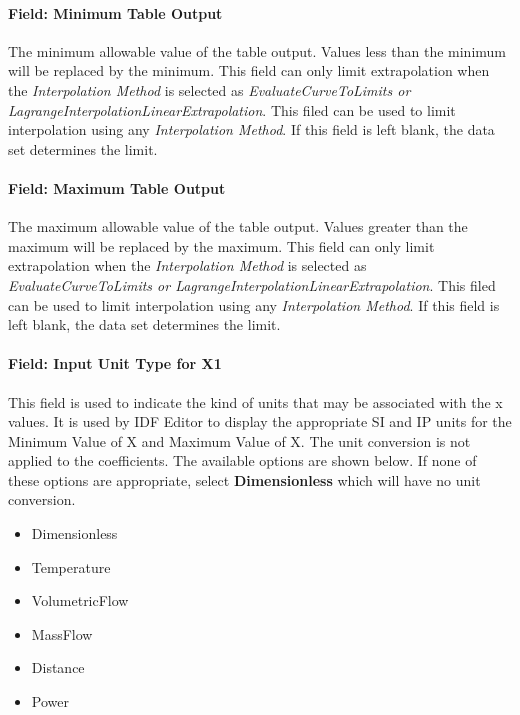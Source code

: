 \paragraph{Field: Minimum Table Output}\label{field-minimum-table-output}

The minimum allowable value of the table output. Values less than the minimum will be replaced by the minimum. This field can only limit extrapolation when the \emph{Interpolation Method} is selected as \emph{EvaluateCurveToLimits or LagrangeInterpolationLinearExtrapolation}. This filed can be used to limit interpolation using any \emph{Interpolation Method}. If this field is left blank, the data set determines the limit.

\paragraph{Field: Maximum Table Output}\label{field-maximum-table-output}

The maximum allowable value of the table output. Values greater than the maximum will be replaced by the maximum. This field can only limit extrapolation when the \emph{Interpolation Method} is selected as \emph{EvaluateCurveToLimits or LagrangeInterpolationLinearExtrapolation}. This filed can be used to limit interpolation using any \emph{Interpolation Method}. If this field is left blank, the data set determines the limit.

\paragraph{Field: Input Unit Type for X1}\label{field-input-unit-type-for-x1}

This field is used to indicate the kind of units that may be associated with the x values. It is used by IDF Editor to display the appropriate SI and IP units for the Minimum Value of X and Maximum Value of X. The unit conversion is not applied to the coefficients. The available options are shown below. If none of these options are appropriate, select \textbf{Dimensionless} which will have no unit conversion.

\begin{itemize}
\item
  Dimensionless
\item
  Temperature
\item
  VolumetricFlow
\item
  MassFlow
\item
  Distance
\item
  Power
\end{itemize}

